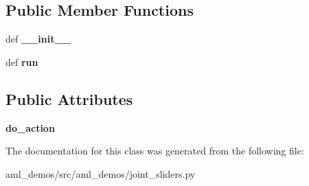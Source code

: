 \subsection*{Public Member Functions}
\begin{DoxyCompactItemize}
\item 
\hypertarget{classaml__demos_1_1joint__sliders_1_1_background_worker_ae9c5b56b7918cada3421182033fbe5af}{def {\bfseries \-\_\-\-\_\-init\-\_\-\-\_\-}}\label{classaml__demos_1_1joint__sliders_1_1_background_worker_ae9c5b56b7918cada3421182033fbe5af}

\item 
\hypertarget{classaml__demos_1_1joint__sliders_1_1_background_worker_a1cab4a6ed2995c9e5dd73f3d16adb6a8}{def {\bfseries run}}\label{classaml__demos_1_1joint__sliders_1_1_background_worker_a1cab4a6ed2995c9e5dd73f3d16adb6a8}

\end{DoxyCompactItemize}
\subsection*{Public Attributes}
\begin{DoxyCompactItemize}
\item 
\hypertarget{classaml__demos_1_1joint__sliders_1_1_background_worker_ae6ec32bbbd58add09b699f532baa904b}{{\bfseries do\-\_\-action}}\label{classaml__demos_1_1joint__sliders_1_1_background_worker_ae6ec32bbbd58add09b699f532baa904b}

\end{DoxyCompactItemize}


The documentation for this class was generated from the following file\-:\begin{DoxyCompactItemize}
\item 
aml\-\_\-demos/src/aml\-\_\-demos/joint\-\_\-sliders.\-py\end{DoxyCompactItemize}
